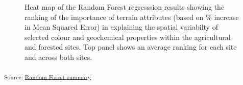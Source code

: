 \documentclass[
  number]{elsarticle}
\begin{document}
\begin{figure}[H]


\caption{\label{fig-rf-results}Heat map of the Random Forest regresssion
results showing the ranking of the importance of terrain attributes
(based on \% increase in Mean Squared Error) in explaining the spatial
variabilty of selected colour and geochemical properties within the
agricultural and forested sites. Top panel shows an average ranking for
each site and across both sites.}

\end{figure}%

\textsubscript{Source:
\href{https://alex-koiter.github.io/spatial-variability-soil-manuscript/notebooks/RF_summary.qmd.html\#cell-fig-RF-results}{Random
Forest summary}}
\end{document}
